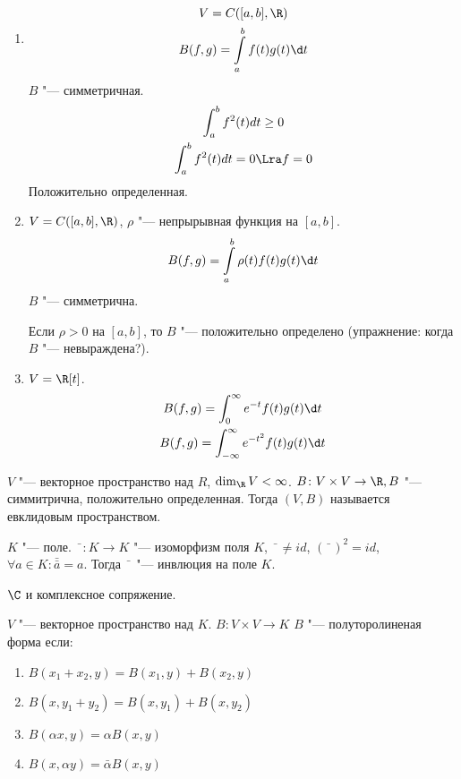 \begin{exmp}
\begin{enumerate}
	\item
		\begin{gather*}
			V = C([a, b], \R) \\
			B(f, g) = \int\limits_a^b f(t)g(t)\d t
		\end{gather*}
		$B$ "--- симметричная.
		\begin{gather*}
			\int_{a}^{b}f^2(t)dt \ge 0 \\
			\int_{a}^{b}f^2(t)dt = 0 \Lra f = 0
		\end{gather*}
		Положительно определенная.

	\item
		$V = C([a, b], \R)$,
		$\rho$ "--- непрырывная функция на $[a, b]$.
		\[ B(f, g) = \int\limits_a^b \rho(t)f(t)g(t)\d t \]
		$B$ "--- симметрична.

		Если $\rho > 0$ на $[a, b]$, то $B$ "--- положительно определено
		(упражнение: когда $B$ "--- невыраждена?).

	\item
		$V = \R[t]$.
		\begin{gather*}
			B(f, g) = \int_0^\infty e^{-t}f(t)g(t)\d t \\
			B(f, g) = \int_{-\infty}^{\infty}e^{-t^2}f(t)g(t)\d t
		\end{gather*}
	\end{enumerate}
\end{exmp}

\begin{Def}
	$V$ "--- векторное пространство над $R$, $\dim_{\R}V < \infty$.
	$B \colon V \times V \to \R, B$ "--- симмитрична, положительно определенная.
	Тогда $(V, B)$ называется евклидовым пространством.
\end{Def}

\begin{Def}
	$K$ "--- поле.
	$\bar{\phantom{x}}\colon K \to K$ "--- изоморфизм поля $K$,
	$\bar{\phantom{x}} \ne id$,
	$(\bar{\phantom{x}})^2 = id$,
	$\forall a \in K\colon \bar{\bar a} = a$.
	Тогда $\bar{\phantom{x}}$ "--- инвлюция на поле $K$.
\end{Def}

\begin{exmp}
	$\C$ и комплексное сопряжение.
\end{exmp}

\begin{Def}
	$V$ "--- векторное пространство над $K$.
	$B\colon V \times V \to K$  $B$ "--- полуторолиненая форма если:
	\begin{enumerate}
		\item $B(x_1 + x_2, y) = B(x_1, y) + B(x_2, y)$
		\item $B(x, y_1 + y_2) = B(x, y_1) + B(x, y_2)$
		\item $B(\alpha x, y) = \alpha B(x, y)$
		\item $B(x, \alpha y) = \bar \alpha B(x, y)$
	\end{enumerate}
\end{Def}


